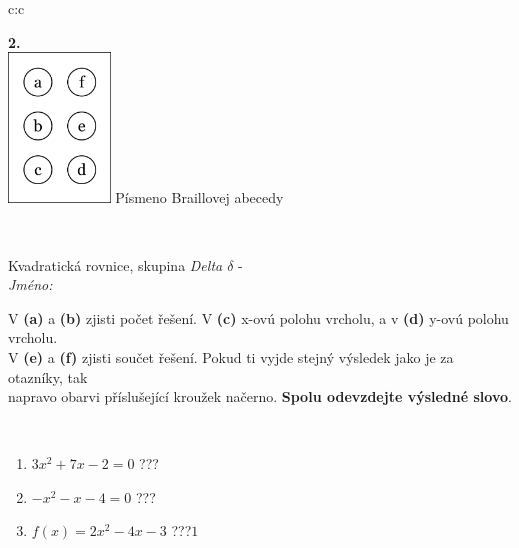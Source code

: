 \documentclass[10pt]{report}
\begin{document}
\begin{tabular}{c:c}
\begin{minipage}[c][104.5mm][t]{0.5\linewidth}
\begin{center}
\begin{minipage}{0.20\linewidth}
\begin{center}
{\Huge\bfseries 2.} \\[2mm]
\includegraphics[height=40mm]{../images/braille.png}
{\small Písmeno Braillovej abecedy}
\end{center}
\end{minipage}
\end{center}
\end{minipage}
\\ \hdashline
\begin{minipage}[c][104.5mm][t]{0.5\linewidth}
\begin{center}
\vspace{7mm}
{\huge Kvadratická rovnice, skupina \textit{Delta $\delta$} -}\\[5mm]
\textit{Jméno:}\phantom{xxxxxxxxxxxxxxxxxxxxxxxxxxxxxxxxxxxxxxxxxxxxxxxxxxxxxxxxxxxxxxxxx}\\[5mm]
\begin{minipage}{0.95\linewidth}
\begin{center}
V \textbf{(a)} a \textbf{(b)} zjisti počet řešení. V \textbf{(c)} x-ovú polohu vrcholu, a v \textbf{(d)} y-ovú polohu vrcholu.\\V \textbf{(e)} a \textbf{(f)} zjisti součet řešení. Pokud ti vyjde stejný výsledek jako je za otazníky, tak\\napravo obarvi příslušející kroužek načerno. \textbf{Spolu odevzdejte výsledné slovo}.
\end{center}
\end{minipage}
\\[1mm]
\begin{minipage}{0.79\linewidth}
\begin{center}
\begin{varwidth}{\linewidth}
\begin{enumerate}
\Large
\item $3x^2+7x-2=0$\quad \dotfill\; ???\;\dotfill {}
\item $-x^2-x-4=0$\quad \dotfill\; ???\;\dotfill {}
\item $f(x)=2x^2-4x-3$\quad \dotfill\; ???\;\dotfill \quad $1$

\end{enumerate}
\end{varwidth}
\end{center}
\end{minipage}
\end{center}
\end{minipage}
\end{tabular}
\end{document}
